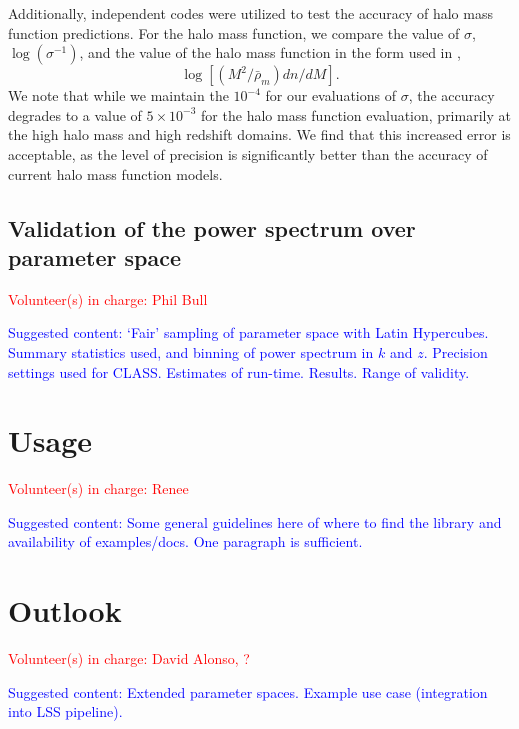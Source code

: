 \documentclass[\docopts]{\docclass}
\newcommand{\vol}[1]{\textcolor{red}{Volunteer(s) in charge: #1}}
\newcommand{\cont}[1]{\textcolor{blue}{Suggested content: #1}}
\begin{document}
Additionally, independent codes were utilized to test the accuracy of halo mass function predictions. For the halo mass function, we compare the value of $\sigma$, $\log(\sigma^{-1})$, and the value of the halo mass function in the form used in \cite{Tinker2008},
\begin{equation}
\log[(M^2/\bar{\rho}_m)dn/dM].
\end{equation}
We note that while we maintain the $10^{-4}$ for our evaluations of $\sigma$, the accuracy degrades to a value of $5\times10^{-3}$ for the halo mass function evaluation, primarily at the high halo mass and high redshift domains. We find that this increased error is acceptable, as the level of precision is significantly better than the accuracy of current halo mass function models.

\subsection{Validation of the power spectrum over parameter space}
\vol{Phil Bull}

\cont{ `Fair' sampling of parameter space with Latin Hypercubes. Summary statistics used, and binning of power spectrum in $k$ and $z$. Precision settings used for CLASS. Estimates of run-time. Results. Range of validity.}


\section{Usage}
\vol{Renee}

\cont{Some general guidelines here of where to find the library and availability of examples/docs. One paragraph is sufficient.}

\section{Outlook}
\vol{David Alonso, ?}

\cont{Extended parameter spaces. Example use case (integration into LSS pipeline).}







\end{document}
